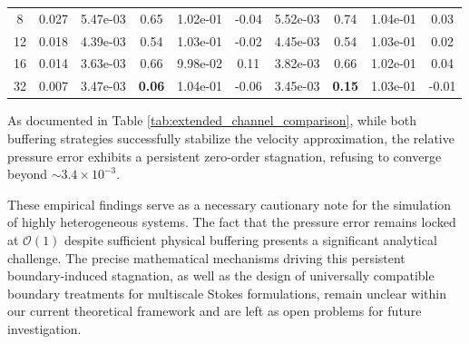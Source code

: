 \documentclass{elsarticle}
\begin{document}
\begin{table}[htbp]
{\begin{tabular}{cc | cc | cc | cc | cc}
            8                     & 0.027                                                                   & 5.47e-03                                                                   & 0.65          & 1.02e-01                           & -0.04                      & 5.52e-03                  & 0.74          & 1.04e-01                           & \phantom{-}0.03            \\
            12                    & 0.018                                                                   & 4.39e-03                                                                   & 0.54          & 1.03e-01                           & -0.02                      & 4.45e-03                  & 0.54          & 1.03e-01                           & \phantom{-}0.02            \\
            16                    & 0.014                                                                   & 3.63e-03                                                                   & 0.66          & 9.98e-02                           & \phantom{-}0.11            & 3.82e-03                  & 0.66          & 1.02e-01                           & \phantom{-}0.04            \\
            32                    & 0.007                                                                   & 3.47e-03                                                                   & \textbf{0.06} & 1.04e-01                           & -0.06                      & 3.45e-03                  & \textbf{0.15} & 1.03e-01                           & -0.01                      \\
            \bottomrule
        \end{tabular}
    }
\end{table}

As documented in Table \ref{tab:extended_channel_comparison}, while both buffering strategies successfully stabilize the velocity approximation, the relative pressure error exhibits a persistent zero-order stagnation, refusing to converge beyond $\sim 3.4 \times 10^{-3}$.

These empirical findings serve as a necessary cautionary note for the simulation of highly heterogeneous systems. The fact that the pressure error remains locked at $\mathcal{O}(1)$ despite sufficient physical buffering presents a significant analytical challenge. The precise mathematical mechanisms driving this persistent boundary-induced stagnation, as well as the design of universally compatible boundary treatments for multiscale Stokes formulations, remain unclear within our current theoretical framework and are left as open problems for future investigation.
\end{document}
